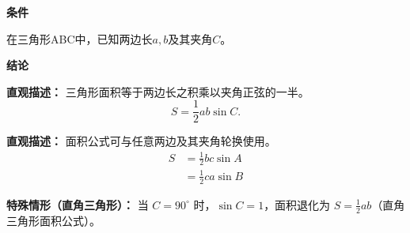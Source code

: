 \begin{statementbox}
	\textbf{\textcolor{CStatement}{条件}}
	\begin{description}[style=nextline, leftmargin=2.8em, labelsep=0.5em, itemsep=0.35em]
		\item[\textbf{\textcolor{CStatement}{条件 1（三角形与边角）：}}] 在三角形ABC中，已知两边长$a,b$及其夹角$C$。
	\end{description}

	\textbf{\textcolor{CStatement}{结论}}
	\begin{description}[style=nextline, leftmargin=2.8em, labelsep=0.5em, itemsep=0.45em]
		\item[\textbf{\textcolor{CStatement}{结论一（两边夹角面积）：}}]
			\textbf{\textcolor{CStatement}{直观描述：}}
			三角形面积等于两边长之积乘以夹角正弦的一半。
			\[
				S = \frac{1}{2}ab\sin C.
			\]

		\item[\textbf{\textcolor{CStatement}{推广结论（轮换对称形式）：}}]
			\textbf{\textcolor{CStatement}{直观描述：}}
			面积公式可与任意两边及其夹角轮换使用。
			\[
				\begin{aligned}
					S &= \frac{1}{2}bc\sin A \\
					&= \frac{1}{2}ca\sin B
			\end{aligned}
			\]
	\end{description}

	\medskip
	\textbf{\textcolor{CStatement}{特殊情形（直角三角形）：}}
	当 $C = 90^\circ$ 时，$\sin C = 1$，面积退化为 $S = \frac{1}{2}ab$（直角三角形面积公式）。
\end{statementbox}
